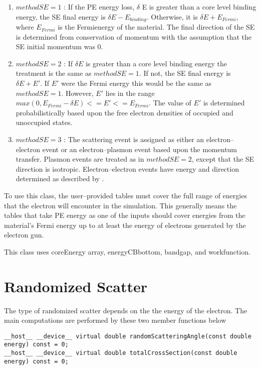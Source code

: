 \begin{enumerate}
    \item $methodSE=1$ \cite{ding1996mcmodeling}: If the PE energy loss, $\delta$ E is greater than a core level binding energy, the SE final energy is $\delta E-E_{binding}$. Otherwise, it is $\delta E + E_{Fermi}$, where $E_{Fermi}$ is the Fermienergy of the material. The final direction of the SE is determined from conservation of momentum with the assumption that the SE initial momentum was 0.
    \item $methodSE=2$ \cite{ding2001mcse}: If $\delta E$ is greater than a core level binding energy the treatment is the same as $methodSE=1$. If not, the SE final energy is $\delta E + E'$. If $E'$ were the Fermi energy this would be the same as $methodSE = 1$. However, $E'$ lies in the range $max(0, E_{Fermi} - \delta E) <= E' <= E_{Fermi}$. The value of $E'$ is determined probabilistically based upon the free electron densities of occupied and unoccupied states.
    \item $methodSE=3$ \cite{mao2008electron}: The scattering event is assigned as either an electron--electron event or an electron--plasmon event based upon the momentum transfer. Plasmon events are treated as in $methodSE = 2$, except that the SE direction is isotropic. Electron--electron events have energy and direction determined as described by \cite{mao2008electron}.
\end{enumerate}

To use this class, the user--provided tables must cover the full range of energies that the electron will encounter in the simulation. This generally means the tables that take PE energy as one of the inputs should cover energies from the material's Fermi energy up to at least the energy of electrons generated by the electron gun.

This class uses coreEnergy array, energyCBbottom, bandgap, and workfunction.

\section{Randomized Scatter}
The type of randomized scatter depends on the the energy of the electron. The main computations are performed by these two member functions below

\begin{lstlisting}
__host__ __device__ virtual double randomScatteringAngle(const double energy) const = 0;
__host__ __device__ virtual double totalCrossSection(const double energy) const = 0;
\end{lstlisting}


